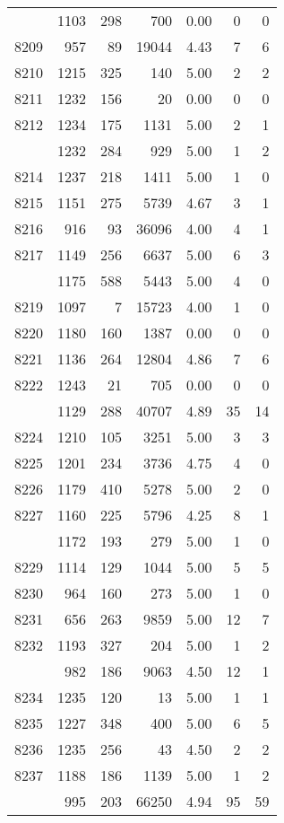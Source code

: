 \documentclass[
]{article}
\begin{document}
\begin{table}
\begin{tabular}[t]{lrrrrrr}
\addlinespace
8208 & 1103 & 298 & 700 & 0.00 & 0 & 0\\
8209 & 957 & 89 & 19044 & 4.43 & 7 & 6\\
8210 & 1215 & 325 & 140 & 5.00 & 2 & 2\\
8211 & 1232 & 156 & 20 & 0.00 & 0 & 0\\
8212 & 1234 & 175 & 1131 & 5.00 & 2 & 1\\
\addlinespace
8213 & 1232 & 284 & 929 & 5.00 & 1 & 2\\
8214 & 1237 & 218 & 1411 & 5.00 & 1 & 0\\
8215 & 1151 & 275 & 5739 & 4.67 & 3 & 1\\
8216 & 916 & 93 & 36096 & 4.00 & 4 & 1\\
8217 & 1149 & 256 & 6637 & 5.00 & 6 & 3\\
\addlinespace
8218 & 1175 & 588 & 5443 & 5.00 & 4 & 0\\
8219 & 1097 & 7 & 15723 & 4.00 & 1 & 0\\
8220 & 1180 & 160 & 1387 & 0.00 & 0 & 0\\
8221 & 1136 & 264 & 12804 & 4.86 & 7 & 6\\
8222 & 1243 & 21 & 705 & 0.00 & 0 & 0\\
\addlinespace
8223 & 1129 & 288 & 40707 & 4.89 & 35 & 14\\
8224 & 1210 & 105 & 3251 & 5.00 & 3 & 3\\
8225 & 1201 & 234 & 3736 & 4.75 & 4 & 0\\
8226 & 1179 & 410 & 5278 & 5.00 & 2 & 0\\
8227 & 1160 & 225 & 5796 & 4.25 & 8 & 1\\
\addlinespace
8228 & 1172 & 193 & 279 & 5.00 & 1 & 0\\
8229 & 1114 & 129 & 1044 & 5.00 & 5 & 5\\
8230 & 964 & 160 & 273 & 5.00 & 1 & 0\\
8231 & 656 & 263 & 9859 & 5.00 & 12 & 7\\
8232 & 1193 & 327 & 204 & 5.00 & 1 & 2\\
\addlinespace
8233 & 982 & 186 & 9063 & 4.50 & 12 & 1\\
8234 & 1235 & 120 & 13 & 5.00 & 1 & 1\\
8235 & 1227 & 348 & 400 & 5.00 & 6 & 5\\
8236 & 1235 & 256 & 43 & 4.50 & 2 & 2\\
8237 & 1188 & 186 & 1139 & 5.00 & 1 & 2\\
\addlinespace
8238 & 995 & 203 & 66250 & 4.94 & 95 & 59\\

\end{tabular}
\end{table}
\end{document}
